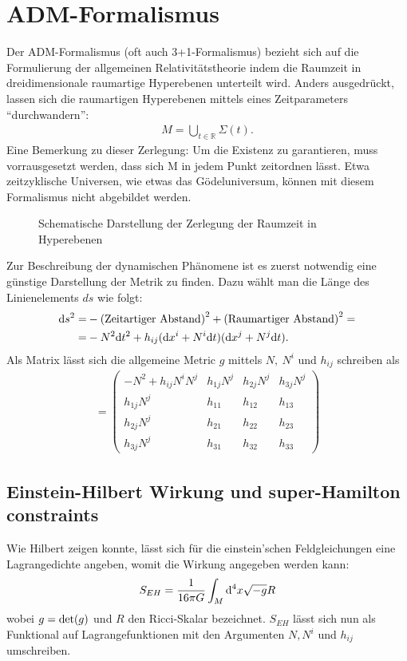 \documentclass{scrartcl}
\begin{document}
	\section{ADM-Formalismus}
		Der ADM-Formalismus\cite{2008GReGr..40.1997A, gourgoulhon20123+1} (oft auch 3+1-Formalismus) bezieht sich auf die Formulierung der allgemeinen Relativitätstheorie
		indem die Raumzeit in dreidimensionale raumartige Hyperebenen unterteilt wird. Anders ausgedrückt, lassen sich die
		raumartigen Hyperebenen mittels eines Zeitparameters ``durchwandern'':
		\begin{align}
			M=\bigcup_{t\in\mathbb{R}} \Sigma(t).
		\end{align}
		Eine Bemerkung zu dieser Zerlegung: Um die Existenz zu garantieren, muss vorrausgesetzt werden, dass sich M in jedem
		Punkt zeitordnen lässt. Etwa zeitzyklische Universen, wie etwas das G\"odeluniversum, können mit diesem Formalismus nicht
		abgebildet werden.
		\begin{figure}
			\centering
			
			\caption{Schematische Darstellung der Zerlegung der Raumzeit in Hyperebenen}
		\end{figure}
		
		Zur Beschreibung der dynamischen Phänomene ist es zuerst notwendig eine günstige Darstellung der Metrik
		zu finden. Dazu wählt man die Länge des Linienelements $ds$ wie folgt:
		\begin{align}
			{\rm d}s^2=&-{\rm (Zeitartiger\ Abstand)}^2+{\rm (Raumartiger\ Abstand)}^2=\notag\\
			=&-N^2 {\rm d}t^2+h_{ij}({\rm d}x^i+N^i {\rm d}t)({\rm d}x^j+N^j {\rm d}t).
		\end{align}
		Als Matrix lässt sich die allgemeine Metric $g$ mittels $N,\ N^i$ und $h_{ij}$ schreiben als
		\begin{align}
			[g]=\left(
			\begin{array}{cccc}
				-N^2+h_{ij}N^i N^j & h_{1j}N^j & h_{2j}N^j & h_{3j}N^j \\
				h_{1j}N^j & h_{11} & h_{12} & h_{13}\\
				h_{2j}N^j & h_{21} & h_{22} & h_{23}\\
				h_{3j}N^j & h_{31} & h_{32} & h_{33}
			\end{array}\right)
			\label{equ:gmatrix}
		\end{align}
	\subsection{Einstein-Hilbert Wirkung und super-Hamilton constraints}
		Wie Hilbert zeigen konnte, lässt sich für die einstein'schen Feldgleichungen eine Lagrangedichte
		angeben, womit die Wirkung angegeben werden kann:
		\begin{align}
			S_{EH}=\frac{1}{16\pi G}\int_M{\rm d}^4x \sqrt{-g}R
		\end{align}
		wobei $g= {\rm det}(g)$ und $R$ den Ricci-Skalar bezeichnet.
		$S_{EH}$ lässt sich nun als Funktional auf Lagrangefunktionen mit den Argumenten $N,N^i$ und $h_{ij}$ umschreiben.
		
\end{document}
